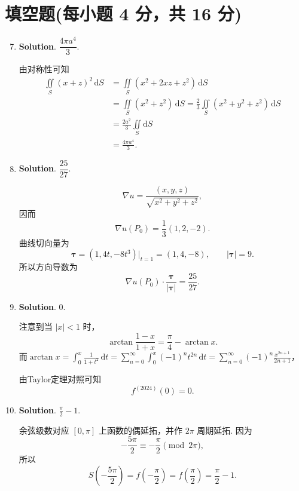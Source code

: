 \documentclass[../main.tex]{subfiles}
\begin{document}
\section{填空题(每小题 4 分，共 16 分)}
\begin{enumerate}
  \setcounter{enumi}{6}
  \item \textbf{Solution}. $\dfrac{4\pi a^4}{3}$.

        由对称性可知
        \[
          \begin{aligned}
            \iint\limits_{S} (x+z)^2\,\mathrm{d}S & =\iint\limits_{S} (x^2+2xz+z^2)\,\mathrm{d}S                                                      \\
                                                  & =\iint\limits_{S} (x^2+z^2)\,\mathrm{d}S = \frac{2}{3}\iint\limits_{S} (x^2+y^2+z^2)\,\mathrm{d}S \\
                                                  & =\frac{2a^2}{3}\iint\limits_{S} \mathrm{d}S                                                       \\
                                                  & =\frac{4\pi a^4}{3}.
          \end{aligned}
        \]

  \item \textbf{Solution}. $\dfrac{25}{27}$.

        \[
          \nabla u=\frac{(x,y,z)}{\sqrt{x^2+y^2+z^2}},
        \]
        因而
        \[
          \nabla u(P_0)=\frac13(1,2,-2).
        \]
        曲线切向量为
        \[
          \boldsymbol{\tau}=(1,4t,-8t^3)\big|_{t=1}=(1,4,-8),\qquad |\boldsymbol{\tau}|=9.
        \]
        所以方向导数为
        \[
          \nabla u(P_0)\cdot\frac{\boldsymbol{\tau}}{|\boldsymbol{\tau}|}
          =\frac{25}{27}.
        \]

  \item \textbf{Solution}. $0$.

        注意到当 \(|x|<1\) 时，
        \[
          \arctan\frac{1-x}{1+x}=\frac{\pi}{4}-\arctan x.
        \]
        而$\arctan x = \int_{0}^{x}\frac{1}{1+t^2}\,\mathrm{d}t=\sum_{n=0}^{\infty}\int_{0}^{x}(-1)^n t^{2n}\,\mathrm{d}t=\sum_{n=0}^{\infty}(-1)^n \frac{x^{2n+1}}{2n+1}$，

        由Taylor定理对照可知
        \[
          f^{(2024)}(0)=0.
        \]

  \item \textbf{Solution}. $\frac{\pi}{2}-1$.

        余弦级数对应 \([0,\pi]\) 上函数的偶延拓，并作 \(2\pi\) 周期延拓. 因为
        \[
          -\frac{5\pi}{2}\equiv -\frac{\pi}{2}\pmod{2\pi},
        \]
        所以
        \[
          S\left(-\frac{5\pi}{2}\right)=f\left(-\frac{\pi}{2}\right)=f\left(\frac{\pi}{2}\right)=\frac{\pi}{2}-1.
        \]

\end{enumerate}
\end{document}
